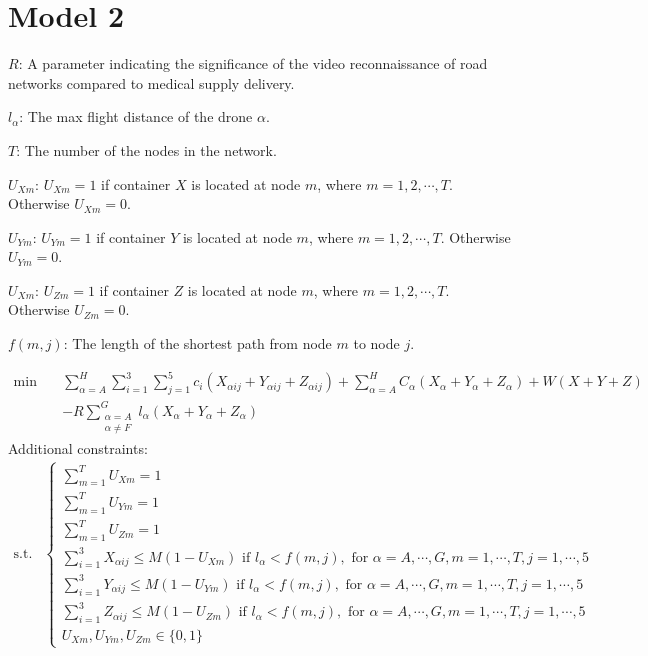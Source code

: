 \documentclass{mcmthesis}
\begin{document}
\section{Model 2}

\noindent $R$: A parameter indicating the significance of the video reconnaissance of road networks compared to medical supply delivery. 

\noindent $l_\alpha$: The max flight distance of the drone $\alpha$.

\noindent $T$: The number of the nodes in the network.

\noindent $U_{Xm}$: $U_{Xm}=1$ if container $X$ is located at node $m$, where $m=1,2,\cdots,T$. Otherwise $U_{Xm}=0$.

\noindent $U_{Ym}$: $U_{Ym}=1$ if container $Y$ is located at node $m$, where $m=1,2,\cdots,T$. Otherwise $U_{Ym}=0$.

\noindent $U_{Xm}$: $U_{Zm}=1$ if container $Z$ is located at node $m$, where $m=1,2,\cdots,T$. Otherwise $U_{Zm}=0$.

\noindent $f(m,j)$: The length of the shortest path from node $m$ to node $j$.

\[
\begin{aligned}
\min\quad&\sum_{\alpha=A}^{H}\sum_{i=1}^{3}\sum_{j=1}^{5}c_{i}\left(X_{\alpha ij}+Y_{\alpha ij}+Z_{\alpha ij}\right)
+\sum_{\alpha=A}^{H}C_{{\alpha}}\left(X_{\alpha}+Y_{\alpha }+Z_{\alpha }\right)+W(X+Y+Z)\\
&-R\sum_{\substack{\alpha=A\\ \alpha\ne F}}^{G}l_\alpha (X_\alpha+Y_\alpha+Z_\alpha)
\end{aligned}
\]
Additional constraints:
\[
\begin{aligned}
\text{s.t.}&
\left\{
\begin{array}{lr}
\sum\limits_{m=1}^{T}U_{Xm}=1\\
\sum\limits_{m=1}^{T}U_{Ym}=1\\
\sum\limits_{m=1}^{T}U_{Zm}=1\\
\sum\limits_{i=1}^3X_{\alpha ij}\le M(1-U_{Xm})\text{ if }l_{\alpha}< f(m,j)  ,\text{ for }\alpha=A,\cdots,G,m=1,\cdots,T,j=1,\cdots,5\\
\sum\limits_{i=1}^3Y_{\alpha ij}\le M(1-U_{Ym})\text{ if }l_{\alpha}< f(m,j)  ,\text{ for }\alpha=A,\cdots,G,m=1,\cdots,T,j=1,\cdots,5\\
\sum\limits_{i=1}^3Z_{\alpha ij}\le M(1-U_{Zm})\text{ if }l_{\alpha}< f(m,j)  ,\text{ for }\alpha=A,\cdots,G,m=1,\cdots,T,j=1,\cdots,5\\
U_{Xm},U_{Ym},U_{Zm} \in \{0,1\}
\end{array}
\right.
\end{aligned}
\]
\end{document}
